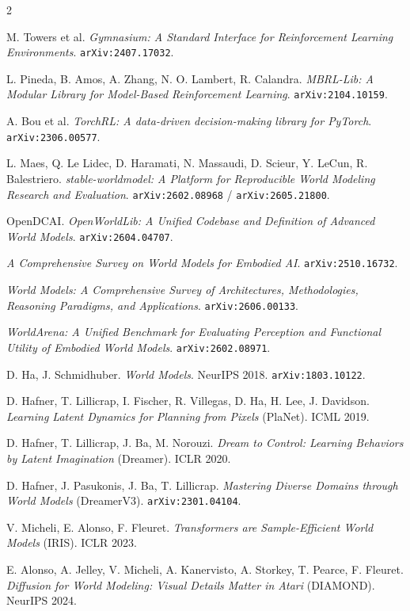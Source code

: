 \documentclass[10pt,a4paper]{article}
\begin{document}
{\scriptsize
\setlength{\columnsep}{7mm}
\begin{multicols}{2}
\begin{enumerate}[leftmargin=5.5mm,itemsep=0.8mm,label={\color{muted}[\arabic*]}]
  \item M. Towers et al. \emph{Gymnasium: A Standard Interface for Reinforcement Learning Environments}. \texttt{arXiv:2407.17032}.
  \item L. Pineda, B. Amos, A. Zhang, N. O. Lambert, R. Calandra. \emph{MBRL-Lib: A Modular Library for Model-Based Reinforcement Learning}. \texttt{arXiv:2104.10159}.
  \item A. Bou et al. \emph{TorchRL: A data-driven decision-making library for PyTorch}. \texttt{arXiv:2306.00577}.
  \item L. Maes, Q. Le Lidec, D. Haramati, N. Massaudi, D. Scieur, Y. LeCun, R. Balestriero. \emph{stable-worldmodel: A Platform for Reproducible World Modeling Research and Evaluation}. \texttt{arXiv:2602.08968} / \texttt{arXiv:2605.21800}.
  \item OpenDCAI. \emph{OpenWorldLib: A Unified Codebase and Definition of Advanced World Models}. \texttt{arXiv:2604.04707}.
  \item \emph{A Comprehensive Survey on World Models for Embodied AI}. \texttt{arXiv:2510.16732}.
  \item \emph{World Models: A Comprehensive Survey of Architectures, Methodologies, Reasoning Paradigms, and Applications}. \texttt{arXiv:2606.00133}.
  \item \emph{WorldArena: A Unified Benchmark for Evaluating Perception and Functional Utility of Embodied World Models}. \texttt{arXiv:2602.08971}.
  \item D. Ha, J. Schmidhuber. \emph{World Models}. NeurIPS 2018. \texttt{arXiv:1803.10122}.
  \item D. Hafner, T. Lillicrap, I. Fischer, R. Villegas, D. Ha, H. Lee, J. Davidson. \emph{Learning Latent Dynamics for Planning from Pixels} (PlaNet). ICML 2019.
  \item D. Hafner, T. Lillicrap, J. Ba, M. Norouzi. \emph{Dream to Control: Learning Behaviors by Latent Imagination} (Dreamer). ICLR 2020.
  \item D. Hafner, J. Pasukonis, J. Ba, T. Lillicrap. \emph{Mastering Diverse Domains through World Models} (DreamerV3). \texttt{arXiv:2301.04104}.
  \item V. Micheli, E. Alonso, F. Fleuret. \emph{Transformers are Sample-Efficient World Models} (IRIS). ICLR 2023.
  \item E. Alonso, A. Jelley, V. Micheli, A. Kanervisto, A. Storkey, T. Pearce, F. Fleuret. \emph{Diffusion for World Modeling: Visual Details Matter in Atari} (DIAMOND). NeurIPS 2024.

\end{enumerate}
\end{multicols}}
\end{document}
